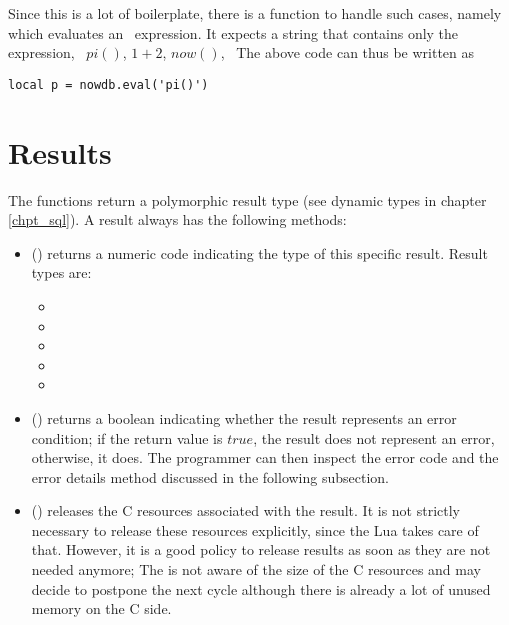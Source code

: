 Since this is a lot of boilerplate,
there is a function to handle such cases,
namely  which evaluates
an \sql\ expression. It expects a string that
contains only the expression, \eg\
$pi()$, $1+2$, $now()$, \etc\
The above code can thus be written as

\begin{lua}
\begin{lstlisting}
local p = nowdb.eval('pi()')
\end{lstlisting}
\end{lua}

\section{Results}
The  functions return
a polymorphic result type (see dynamic types
in chapter \ref{chpt_sql}).
A result always has the following methods:
\begin{itemize}
\item {}()
      returns a numeric code indicating
      the type of this specific result.
      Result types are:
      \begin{itemize}
      \item {}
      \item {}
      \item \term{nowdb.REPORT}
      \item {}
      \item {}
      \end{itemize}
\item {}()
      returns a boolean indicating whether
      the result represents an error condition;
      if the return value is $true$,
      the result does not represent an error,
      otherwise, it does.
      The programmer can then inspect the error code
      and the error details method discussed in the
      following subsection.
\item \term{release}()
      releases the C resources associated with the result.
      It is not strictly necessary to release these resources
      explicitly, since the Lua  takes care of that.
      However, it is a good policy to release results as soon
      as they are not needed anymore; The \acronym{gc} is not
      aware of the size of the C resources and may decide to
      postpone the next cycle although there is already
      a lot of unused memory on the C side.
\end{itemize}

